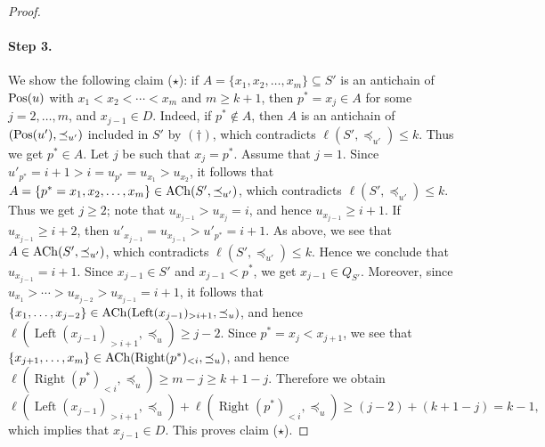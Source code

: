 \documentclass[reqno]{amsart}
\theoremstyle{definition}
\theoremstyle{remark}
\numberwithin{equation}{section}
\begin{document}
\begin{proof}
		\paragraph{\bf Step 3.} 
		We show the following claim ($\star$):
		if $A=\{x_1, x_2, \dots,x_{m}\}\subseteq S'$ is an antichain of $\operatorname{Pos}(u)$ with 
		$x_1<x_2<\cdots<x_m$ and $m\ge k+1$, 
		then $p^\ast=x_j\in A$ for some $j=2,\dots,m$,
		and $x_{j-1}\in D$.
		Indeed,
		if $p^\ast\notin A$,
		then $A$ is an antichain of $(\operatorname{Pos}(u'),\preceq_{u'})$ included in $S'$ by
		$(\dagger)$,
		which contradicts $\ell(S',\preceq_{u'})\le k$.
		Thus we get $p^\ast\in A$.
		Let $j$ be such that $x_j=p^\ast$.
		Assume that $j=1$.
		Since $u'_{p^\ast}=i+1>i=u_{p^\ast}=u_{x_1}>u_{x_2}$,
		it follows that $A=\{p^\ast=x_1,x_2,\dots,x_{m}\}\in \operatorname{ACh}(S',\preceq_{u'})$,
		which contradicts $\ell(S',\preceq_{u'})\le k$.
		Thus we get $j\ge2$; note that $u_{x_{j-1}}>u_{x_j}=i$, 
		and hence $u_{x_{j-1}}\ge i+1$.
		If $u_{x_{j-1}}\ge i+2$, then $u'_{x_{j-1}}=u_{x_{j-1}}>u'_{p^\ast}=i+1$.
		As above, we see that $A\in\operatorname{ACh}(S',\preceq_{u'})$,
		which contradicts $\ell(S',\preceq_{u'})\le k$.
		Hence we conclude that $u_{x_{j-1}}=i+1$.
		Since $x_{j-1}\in S'$ and $x_{j-1}<p^\ast$, we get $x_{j-1}\in Q_{S'}$.
		Moreover, since $u_{x_1}>\cdots>u_{x_{j-2}}>u_{x_{j-1}}=i+1$,
		it follows that $\{x_1,\dots,x_{j-2}\}\in\operatorname{ACh}(\operatorname{Left}(x_{j-1})_{>i+1},\preceq_u)$,
		and hence $\ell(\operatorname{Left}(x_{j-1})_{>i+1},\preceq_u)\ge j-2$.
		Since $p^\ast=x_j<x_{j+1}$,
		we see that $\{x_{j+1},\dots,x_{m}\}\in\operatorname{ACh}(\operatorname{Right}(p^\ast)_{<i},\preceq_u)$,
		and hence $\ell(\operatorname{Right}(p^\ast)_{<i},\preceq_u)\ge m-j\ge k+1-j$.
		Therefore we obtain
		$$
		\ell(\operatorname{Left}(x_{j-1})_{>i+1},\preceq_u)+
		\ell(\operatorname{Right}(p^\ast)_{<i},\preceq_u)\ge (j-2)+(k+1-j)=k-1,
		$$
		which implies that $x_{j-1}\in D$.
		This proves claim ($\star$).

\end{proof}
\end{document}

